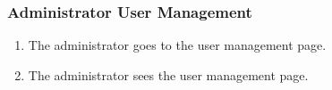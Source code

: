 \subsubsection{Administrator User Management}

\begin{enumerate}
    \item The administrator goes to the user management page.
    \item The administrator sees the user management page.
\end{enumerate}

